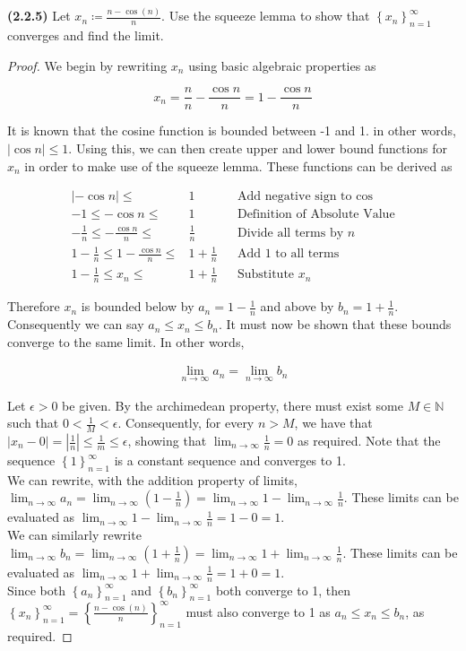 \documentclass[12pt]{article}
\newcommand{\limtoinf}[1]{\lim_{ {#1} \to\infty}}
\newcommand{\abs}[1]{\left| {#1} \right|}
\newcommand{\seq}[2][n]{\left\{ {#2} \right\}_{#1=1}^\infty}
\newcommand{\paren}[1]{\left( {#1} \right)}
\newcommand{\bN}{\mathbb{N}}
\begin{document}
\newpage

\noindent \textbf{(2.2.5)} Let $x_n\coloneq\frac{n-\cos(n)}{n}$. Use the squeeze lemma to show that $\seq{x_n}$ converges and find the limit.

\begin{proof}
	We begin by rewriting $x_n$ using basic algebraic properties as 

\begin{equation*}
	x_n=\frac{n}{n}-\frac{\cos{n}}{n}=1-\frac{\cos{n}}{n}
\end{equation*}

It is known that the cosine function is bounded between -1 and 1. in other words, $\abs{\cos{n}}\le1$. Using this, we can then create upper and lower bound functions for $x_n$ in order to make use of the squeeze lemma. These functions can be derived as

\begin{align*}
	\abs{-\cos{n}}\le&1 && \text{Add negative sign to }\cos \\
	-1\le-\cos{n}\le&1 && \text{Definition of Absolute Value} \\
	-\frac{1}{n}\le-\frac{\cos{n}}{n}\le&\frac{1}{n} && \text{Divide all terms by }n \\
	1-\frac{1}{n}\le1-\frac{\cos{n}}{n}\le&1+\frac{1}{n} && \text{Add 1 to all terms} \\
	1-\frac{1}{n}\le x_n\le&1+\frac{1}{n} && \text{Substitute }x_n
\end{align*}

\noindent Therefore $x_n$ is bounded below by $a_n=1-\frac{1}{n}$ and above by $b_n=1+\frac{1}{n}$. Consequently we can say $a_n\le x_n\le b_n$. It must now be shown that these bounds converge to the same limit. In other words, 

\begin{align*}
	\limtoinf{n} a_n = \limtoinf{n} b_n
\end{align*}

Let $\epsilon>0$ be given. By the archimedean property, there must exist some $M\in\bN$ such that $0<\frac{1}{M}<\epsilon$. Consequently, for every $n>M$, we have that $\abs{x_n-0}=\abs{\frac{1}{n}}\le\frac{1}{m}\le\epsilon$, showing that $\limtoinf{n}\frac{1}{n}=0$ as required. Note that the sequence $\seq{1}$ is a constant sequence and converges to 1. \\

We can rewrite, with the addition property of limits, $\limtoinf{n} a_n=\limtoinf{n}\paren{1-\frac{1}{n}}=\limtoinf{n} 1 - \limtoinf{n} \frac{1}{n}$. These limits can be evaluated as $\limtoinf{n} 1 - \limtoinf{n} \frac{1}{n}=1-0=1$. \\

We can similarly rewrite $\limtoinf{n} b_n=\limtoinf{n}\paren{1+\frac{1}{n}}=\limtoinf{n} 1 + \limtoinf{n} \frac{1}{n}$. These limits can be evaluated as $\limtoinf{n} 1 + \limtoinf{n} \frac{1}{n}=1+0=1$. \\

Since both $\seq{a_n}$ and $\seq{b_n}$ both converge to 1, then $\seq{x_n}=\seq{\frac{n-\cos(n)}{n}}$ must also converge to 1 as $a_n\le x_n\le b_n$, as required.
 
\end{proof}
\end{document}
